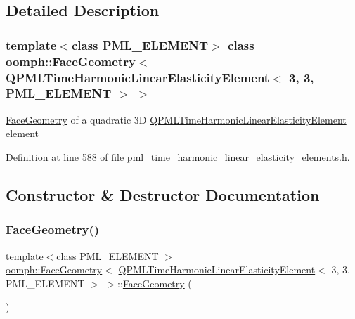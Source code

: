 \subsection{Detailed Description}
\subsubsection*{template$<$class P\+M\+L\+\_\+\+E\+L\+E\+M\+E\+NT$>$\newline
class oomph\+::\+Face\+Geometry$<$ Q\+P\+M\+L\+Time\+Harmonic\+Linear\+Elasticity\+Element$<$ 3, 3, P\+M\+L\+\_\+\+E\+L\+E\+M\+E\+N\+T $>$ $>$}

\hyperlink{classoomph_1_1FaceGeometry}{Face\+Geometry} of a quadratic 3D \hyperlink{classoomph_1_1QPMLTimeHarmonicLinearElasticityElement}{Q\+P\+M\+L\+Time\+Harmonic\+Linear\+Elasticity\+Element} element 

Definition at line 588 of file pml\+\_\+time\+\_\+harmonic\+\_\+linear\+\_\+elasticity\+\_\+elements.\+h.



\subsection{Constructor \& Destructor Documentation}
\mbox{\label{classoomph_1_1FaceGeometry_3_01QPMLTimeHarmonicLinearElasticityElement_3_013_00_013_00_01PML__ELEMENT_01_4_01_4_ab6d487acad6cd03405a7068a1614efa1}} 
\subsubsection{\texorpdfstring{Face\+Geometry()}{FaceGeometry()}}
{\footnotesize\ttfamily template$<$class P\+M\+L\+\_\+\+E\+L\+E\+M\+E\+NT $>$ \\
\hyperlink{classoomph_1_1FaceGeometry}{oomph\+::\+Face\+Geometry}$<$ \hyperlink{classoomph_1_1QPMLTimeHarmonicLinearElasticityElement}{Q\+P\+M\+L\+Time\+Harmonic\+Linear\+Elasticity\+Element}$<$ 3, 3, P\+M\+L\+\_\+\+E\+L\+E\+M\+E\+NT $>$ $>$\+::\hyperlink{classoomph_1_1FaceGeometry}{Face\+Geometry} (\begin{DoxyParamCaption}{ }\end{DoxyParamCaption})\hspace{0.3cm}{\ttfamily [inline]}}



